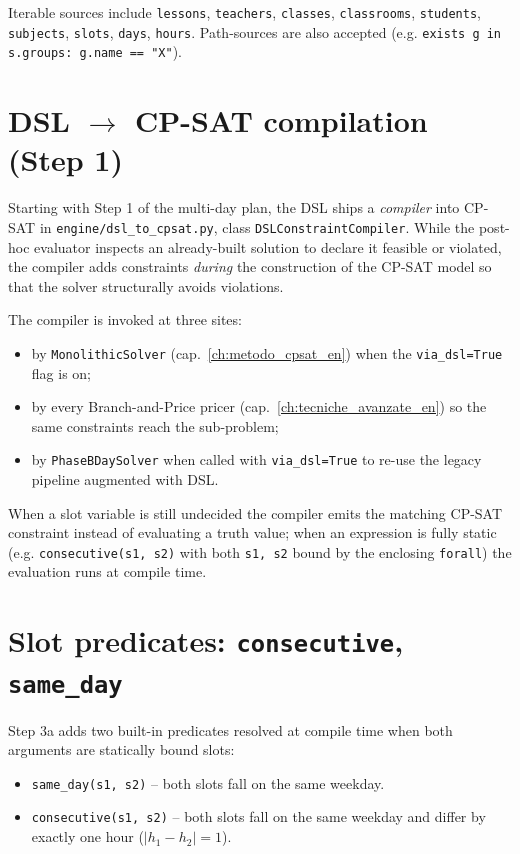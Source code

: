 Iterable sources include \texttt{lessons}, \texttt{teachers},
\texttt{classes}, \texttt{classrooms}, \texttt{students},
\texttt{subjects}, \texttt{slots}, \texttt{days},
\texttt{hours}. Path-sources are also accepted (e.g.
\texttt{exists g in s.groups: g.name == "X"}).

\section{DSL $\to$ CP-SAT compilation (Step 1)}
\label{sec:dsl-cpsat-en}

Starting with Step 1 of the multi-day plan, the DSL ships a
\emph{compiler} into CP-SAT in
\texttt{engine/dsl\_to\_cpsat.py}, class
\texttt{DSLConstraintCompiler}. While the post-hoc evaluator
inspects an already-built solution to declare it feasible or
violated, the compiler adds constraints \emph{during} the
construction of the CP-SAT model so that the solver
structurally avoids violations.

The compiler is invoked at three sites:

\begin{itemize}
\item by \texttt{MonolithicSolver}
  (cap.~\ref{ch:metodo_cpsat_en}) when the
  \texttt{via\_dsl=True} flag is on;
\item by every Branch-and-Price pricer
  (cap.~\ref{ch:tecniche_avanzate_en}) so the same constraints
  reach the sub-problem;
\item by \texttt{PhaseBDaySolver} when called with
  \texttt{via\_dsl=True} to re-use the legacy pipeline
  augmented with DSL.
\end{itemize}

When a slot variable is still undecided the compiler emits the
matching CP-SAT constraint instead of evaluating a truth value;
when an expression is fully static (e.g. \texttt{consecutive(s1,
s2)} with both \texttt{s1, s2} bound by the enclosing
\texttt{forall}) the evaluation runs at compile time.

\section{Slot predicates: \texttt{consecutive}, \texttt{same\_day}}
\label{sec:dsl-slot-preds-en}

Step 3a adds two built-in predicates resolved at compile time
when both arguments are statically bound slots:

\begin{itemize}
\item \texttt{same\_day(s1, s2)} -- both slots fall on the same
  weekday.
\item \texttt{consecutive(s1, s2)} -- both slots fall on the
  same weekday and differ by exactly one hour ($|h_1-h_2|=1$).
\end{itemize}

